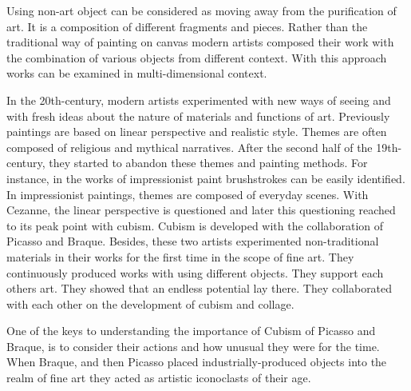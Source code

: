Using non-art object can be considered as moving away from the purification of art. It is a composition of different fragments and pieces. Rather than the traditional way of painting on canvas modern artists composed their work with the combination of various objects from different context. With this approach works can be examined in multi-dimensional context.


In the 20th-century, modern artists experimented with new ways of seeing and with fresh ideas about the nature of materials and functions of art. Previously paintings are based on linear perspective and realistic style. Themes are often composed of religious and mythical narratives. After the second half of the 19th-century, they started to abandon these themes and painting methods. For instance, in the works of impressionist paint brushstrokes can be easily identified. In impressionist paintings, themes are composed of everyday scenes. With Cezanne, the linear perspective is questioned and later this questioning reached to its peak point with cubism. Cubism is developed with the collaboration of Picasso and Braque. Besides, these two artists experimented non-traditional materials in their works for the first time in the scope of fine art. They continuously produced works with using different objects. They support each others art. They showed that an endless potential lay there. They collaborated with each other on the development of cubism and collage.

One of the keys to understanding the importance of Cubism of Picasso and Braque, is to consider their actions and how unusual they were for the time. When Braque, and then Picasso placed industrially-produced objects into the realm of fine art they acted as artistic iconoclasts of their age. 


